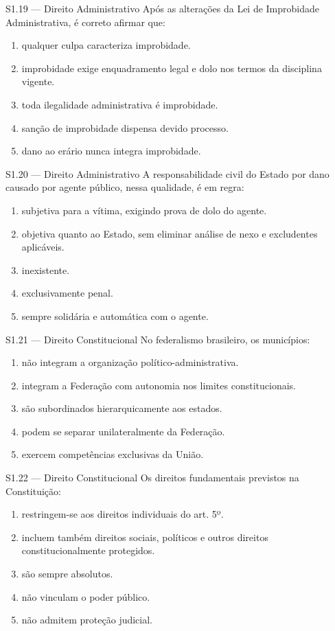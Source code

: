 \begin{questao}{S1.19 — Direito Administrativo}
Após as alterações da Lei de Improbidade Administrativa, é correto afirmar que:
\begin{enumerate}[label=\Alph*)]
\item qualquer culpa caracteriza improbidade.
\item improbidade exige enquadramento legal e dolo nos termos da disciplina vigente.
\item toda ilegalidade administrativa é improbidade.
\item sanção de improbidade dispensa devido processo.
\item dano ao erário nunca integra improbidade.
\end{enumerate}
\end{questao}

\begin{questao}{S1.20 — Direito Administrativo}
A responsabilidade civil do Estado por dano causado por agente público, nessa qualidade, é em regra:
\begin{enumerate}[label=\Alph*)]
\item subjetiva para a vítima, exigindo prova de dolo do agente.
\item objetiva quanto ao Estado, sem eliminar análise de nexo e excludentes aplicáveis.
\item inexistente.
\item exclusivamente penal.
\item sempre solidária e automática com o agente.
\end{enumerate}
\end{questao}

\begin{questao}{S1.21 — Direito Constitucional}
No federalismo brasileiro, os municípios:
\begin{enumerate}[label=\Alph*)]
\item não integram a organização político-administrativa.
\item integram a Federação com autonomia nos limites constitucionais.
\item são subordinados hierarquicamente aos estados.
\item podem se separar unilateralmente da Federação.
\item exercem competências exclusivas da União.
\end{enumerate}
\end{questao}

\begin{questao}{S1.22 — Direito Constitucional}
Os direitos fundamentais previstos na Constituição:
\begin{enumerate}[label=\Alph*)]
\item restringem-se aos direitos individuais do art. 5º.
\item incluem também direitos sociais, políticos e outros direitos constitucionalmente protegidos.
\item são sempre absolutos.
\item não vinculam o poder público.
\item não admitem proteção judicial.
\end{enumerate}
\end{questao}

